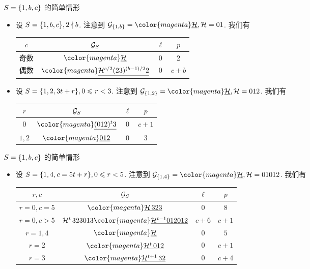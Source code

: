 \documentclass[aspectratio=169]{ctexbeamer}
\renewcommand\ul[1]{{\color{magenta}\underline{#1}}}
\begin{document}
\begin{frame}{$S={\left\{1,b,c\right\}}$ 的简单情形}
	\begin{itemize}
		\item 设 $S={\left\{1,b,c\right\}},2\nmid b$.
		注意到 $\CG_\set{1,b}=\ul\CH, \CH=01$.
		我们有
		\begin{center}
			\begin{tabular}{cccc}
				\toprule
				$c$ & ${\mathcal{G}}_S$ & $\ell$ & $p$\\
				\midrule
				奇数&$\ul\CH$ & $0$ & $2$\\
				偶数&$\ul{\CH^{c/2}(23)^{(b-1)/2}2}$ & $0$ & $c+b$\\
				\bottomrule
			\end{tabular}
		\end{center}

		\item 设 $S={\left\{1,2,3t+r\right\}},0\leqslant r<3$.
		注意到 $\CG_\set{1,2}=\ul\CH, \CH=012$.
		我们有
		\begin{center}
			\begin{tabular}{cccc}
				\toprule
				$r$ & ${\mathcal{G}}_S$ & $\ell$ & $p$\\
				\midrule
				$0$ & $\ul{(012)^t3}$ & $0$ & $c+1$\\
				$1,2$ & $\ul{012}$ & $0$ & $3$\\
				\bottomrule
			\end{tabular}
		\end{center}
	\end{itemize}
\end{frame}


\begin{frame}{$S={\left\{1,b,c\right\}}$ 的简单情形}
	\begin{itemize}
		\item 设 $S={\left\{1,4,c=5t+r\right\}}, 0\leqslant r<5$.
		注意到 $\CG_\set{1,4}=\ul{\CH}, \CH=01012$.
		我们有
		\begin{center}
			\begin{tabular}{cccc}
				\toprule
				$r,c$ & ${\mathcal{G}}_S$ & $\ell$ & $p$\\
				\midrule
				$r=0, c=5$ & $\ul{\CH\,323}$ & $0$ & $8$\\
				$r=0, c>5$ & $\CH^t\,323013\ul{\CH^{t-1}012012}$ & $c+6$ & $c+1$\\
				$r=1,4$ & $\ul\CH$ & $0$ & $5$\\
				$r=2$ & $\ul{\CH^t\,012}$ & $0$ & $c+1$\\
				$r=3$ & $\ul{\CH^{t+1}\,32}$ & $0$ & $c+4$\\
				\bottomrule
			\end{tabular}
		\end{center}
	\end{itemize}
\end{frame}
\end{document}
